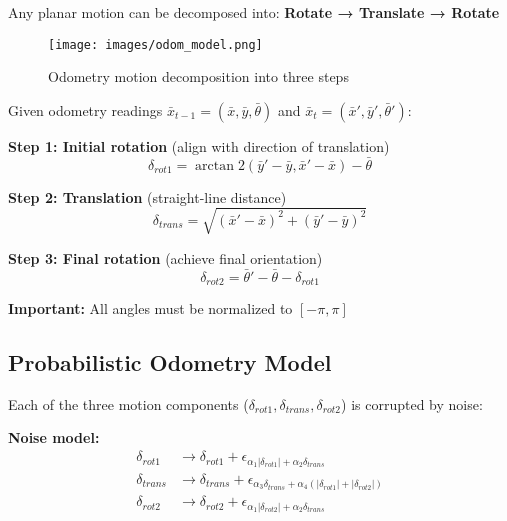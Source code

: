 Any planar motion can be decomposed into: \textbf{Rotate → Translate → Rotate}

\begin{figure}[H]
  \begin{center}
    \texttt{[image: images/odom\_model.png]}
  \end{center}
  \caption{Odometry motion decomposition into three steps}
\end{figure}

\begin{tcolorbox}[colback=blue!5!white,colframe=blue!75!black,title=Odometry Decomposition Formulas]

Given odometry readings $\bar{x}_{t-1} = (\bar{x}, \bar{y}, \bar{\theta})$ and $\bar{x}_t = (\bar{x}', \bar{y}', \bar{\theta}')$:

\vspace{2mm}
\textbf{Step 1: Initial rotation} (align with direction of translation)
\begin{equation}
\delta_{rot1} = \arctan2(\bar{y}' - \bar{y}, \bar{x}' - \bar{x}) - \bar{\theta}
\end{equation}

\textbf{Step 2: Translation} (straight-line distance)
\begin{equation}
\delta_{trans} = \sqrt{(\bar{x}' - \bar{x})^2 + (\bar{y}' - \bar{y})^2}
\end{equation}

\textbf{Step 3: Final rotation} (achieve final orientation)
\begin{equation}
\delta_{rot2} = \bar{\theta}' - \bar{\theta} - \delta_{rot1}
\end{equation}

\textbf{Important:} All angles must be normalized to $[-\pi, \pi]$

\end{tcolorbox}

\subsection{Probabilistic Odometry Model}

Each of the three motion components ($\delta_{rot1}, \delta_{trans}, \delta_{rot2}$) is corrupted by noise:

\textbf{Noise model:}
\begin{align}
\delta_{rot1} &\rightarrow \delta_{rot1} + \epsilon_{\alpha_1 |\delta_{rot1}| + \alpha_2 \delta_{trans}} \\
\delta_{trans} &\rightarrow \delta_{trans} + \epsilon_{\alpha_3 \delta_{trans} + \alpha_4(|\delta_{rot1}| + |\delta_{rot2}|)} \\
\delta_{rot2} &\rightarrow \delta_{rot2} + \epsilon_{\alpha_1 |\delta_{rot2}| + \alpha_2 \delta_{trans}}
\end{align}

